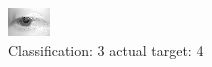 \begin{figure}[h!]
\begin{center}
\includegraphics[width=0.60\columnwidth]{figures/ID2592_class_3_target_4.png}
\end{center}
\caption{ Classification: 3 actual target: 4}
\label{fig:ID2592_class_3_target_4}
\end{figure}
